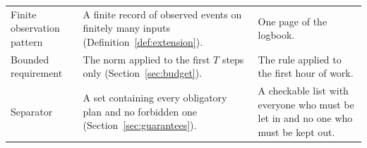 \begin{table}[p]
\begin{tabularx}{\textwidth}{>{\raggedright\arraybackslash}p{2.9cm}Y>{\raggedright\arraybackslash}p{4.4cm}}
Finite observation pattern & A finite record of observed events on finitely many inputs (Definition~\ref{def:extension}). & One page of the logbook.\\
Bounded requirement & The norm applied to the first $T$ steps only (Section~\ref{sec:budget}). & The rule applied to the first hour of work.\\
Separator & A set containing every obligatory plan and no forbidden one (Section~\ref{sec:guarantees}). & A checkable list with everyone who must be let in and no one who must be kept out.\\
\bottomrule
\end{tabularx}
\end{table}
